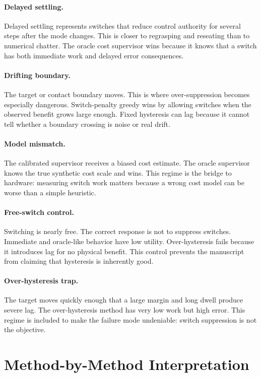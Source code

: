 \documentclass{article}
\begin{document}
\paragraph{Delayed settling.}
Delayed settling represents switches that reduce control authority for several steps after the mode changes.
This is closer to regrasping and reseating than to numerical chatter.
The oracle cost supervisor wins because it knows that a switch has both immediate work and delayed error consequences.

\paragraph{Drifting boundary.}
The target or contact boundary moves.
This is where over-suppression becomes especially dangerous.
Switch-penalty greedy wins by allowing switches when the observed benefit grows large enough.
Fixed hysteresis can lag because it cannot tell whether a boundary crossing is noise or real drift.

\paragraph{Model mismatch.}
The calibrated supervisor receives a biased cost estimate.
The oracle supervisor knows the true synthetic cost scale and wins.
This regime is the bridge to hardware: measuring switch work matters because a wrong cost model can be worse than a simple heuristic.

\paragraph{Free-switch control.}
Switching is nearly free.
The correct response is not to suppress switches.
Immediate and oracle-like behavior have low utility.
Over-hysteresis fails because it introduces lag for no physical benefit.
This control prevents the manuscript from claiming that hysteresis is inherently good.

\paragraph{Over-hysteresis trap.}
The target moves quickly enough that a large margin and long dwell produce severe lag.
The over-hysteresis method has very low work but high error.
This regime is included to make the failure mode undeniable: switch suppression is not the objective.

\section{Method-by-Method Interpretation}
\end{document}
